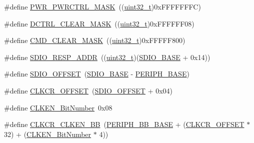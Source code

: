 \begin{DoxyCompactItemize}
\item 
\#define \hyperlink{group___s_d_i_o___private___types_definitions_ga7e6ec7be68d0fbb8fb4e3725cca9a05c}{P\+W\+R\+\_\+\+P\+W\+R\+C\+T\+R\+L\+\_\+\+M\+A\+SK}~((\hyperlink{_p_e___types_8h_a33594304e786b158f3fb30289278f5af}{uint32\+\_\+t})0x\+F\+F\+F\+F\+F\+F\+F\+C)
\item 
\#define \hyperlink{group___s_d_i_o___private___types_definitions_ga9e9fc7810b95805aeeb760bbdd87fa9b}{D\+C\+T\+R\+L\+\_\+\+C\+L\+E\+A\+R\+\_\+\+M\+A\+SK}~((\hyperlink{_p_e___types_8h_a33594304e786b158f3fb30289278f5af}{uint32\+\_\+t})0x\+F\+F\+F\+F\+F\+F08)
\item 
\#define \hyperlink{group___s_d_i_o___private___types_definitions_ga2325d77090e44221b07f8fba5bc9217e}{C\+M\+D\+\_\+\+C\+L\+E\+A\+R\+\_\+\+M\+A\+SK}~((\hyperlink{_p_e___types_8h_a33594304e786b158f3fb30289278f5af}{uint32\+\_\+t})0x\+F\+F\+F\+F\+F800)
\item 
\#define \hyperlink{group___s_d_i_o___private___types_definitions_ga4285ce49b005e3d03ddf9fdc491c4d70}{S\+D\+I\+O\+\_\+\+R\+E\+S\+P\+\_\+\+A\+D\+DR}~((\hyperlink{_p_e___types_8h_a33594304e786b158f3fb30289278f5af}{uint32\+\_\+t})(\hyperlink{openmotestm_2library_2inc_2stm32f10x__map_8h_a95dd0abbc6767893b4b02935fa846f52}{S\+D\+I\+O\+\_\+\+B\+A\+SE} + 0x14))
\item 
\#define \hyperlink{group___s_d_i_o___private___types_definitions_gabf07aced03df5f46d57cea1d4f56d1e3}{S\+D\+I\+O\+\_\+\+O\+F\+F\+S\+ET}~(\hyperlink{openmotestm_2library_2inc_2stm32f10x__map_8h_a95dd0abbc6767893b4b02935fa846f52}{S\+D\+I\+O\+\_\+\+B\+A\+SE} -\/ \hyperlink{openmotestm_2library_2inc_2stm32f10x__map_8h_a9171f49478fa86d932f89e78e73b88b0}{P\+E\+R\+I\+P\+H\+\_\+\+B\+A\+SE})
\item 
\#define \hyperlink{group___s_d_i_o___private___types_definitions_gac5d642be874338519fdec175204ca8ed}{C\+L\+K\+C\+R\+\_\+\+O\+F\+F\+S\+ET}~(\hyperlink{openmotestm_2library_2src_2stm32f10x__sdio_8c_abf07aced03df5f46d57cea1d4f56d1e3}{S\+D\+I\+O\+\_\+\+O\+F\+F\+S\+ET} + 0x04)
\item 
\#define \hyperlink{group___s_d_i_o___private___types_definitions_ga6ad1da47f9d84c54eb620b9231ebec86}{C\+L\+K\+E\+N\+\_\+\+Bit\+Number}~0x08
\item 
\#define \hyperlink{group___s_d_i_o___private___types_definitions_gabfb5772b9b734972b576309f7ca8bf92}{C\+L\+K\+C\+R\+\_\+\+C\+L\+K\+E\+N\+\_\+\+BB}~(\hyperlink{openmotestm_2library_2inc_2stm32f10x__map_8h_aed7efc100877000845c236ccdc9e144a}{P\+E\+R\+I\+P\+H\+\_\+\+B\+B\+\_\+\+B\+A\+SE} + (\hyperlink{openmotestm_2library_2src_2stm32f10x__sdio_8c_ac5d642be874338519fdec175204ca8ed}{C\+L\+K\+C\+R\+\_\+\+O\+F\+F\+S\+ET} $\ast$ 32) + (\hyperlink{openmotestm_2library_2src_2stm32f10x__sdio_8c_a6ad1da47f9d84c54eb620b9231ebec86}{C\+L\+K\+E\+N\+\_\+\+Bit\+Number} $\ast$ 4))

\end{DoxyCompactItemize}
